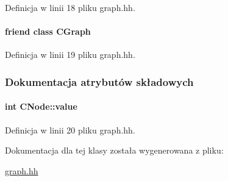 Definicja w linii 18 pliku graph.\+hh.

\hypertarget{class_c_node_a5ba04087b017dfeadb708ba91d6daf1b}{}
\paragraph[{C\+Graph}]{\setlength{\rightskip}{0pt plus 5cm}friend class {\bf C\+Graph}\hspace{0.3cm}{\ttfamily [friend]}}\label{class_c_node_a5ba04087b017dfeadb708ba91d6daf1b}


Definicja w linii 19 pliku graph.\+hh.



\subsubsection{Dokumentacja atrybutów składowych}
\hypertarget{class_c_node_ad08aa99402f6cfbbb9d9580d1f001441}{}
\paragraph[{value}]{\setlength{\rightskip}{0pt plus 5cm}int C\+Node\+::value\hspace{0.3cm}{\ttfamily [private]}}\label{class_c_node_ad08aa99402f6cfbbb9d9580d1f001441}


Definicja w linii 20 pliku graph.\+hh.



Dokumentacja dla tej klasy została wygenerowana z pliku\+:\begin{DoxyCompactItemize}
\item 
\hyperlink{graph_8hh}{graph.\+hh}\end{DoxyCompactItemize}
